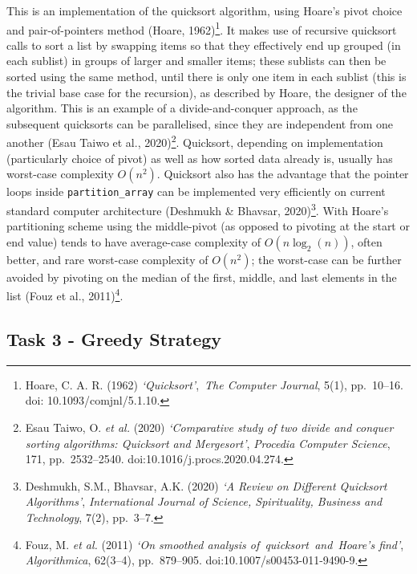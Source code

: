 \documentclass[
]{article}
\begin{document}
This is an implementation of the quicksort algorithm, using Hoare's
pivot choice and pair-of-pointers method (Hoare, 1962)\footnote{Hoare,
  C. A. R. (1962) \emph{`Quicksort'},~\emph{The Computer Journal}, 5(1),
  pp.~10--16. doi: 10.1093/comjnl/5.1.10.}. It makes use of recursive
quicksort calls to sort a list by swapping items so that they
effectively end up grouped (in each sublist) in groups of larger and
smaller items; these sublists can then be sorted using the same method,
until there is only one item in each sublist (this is the trivial base
case for the recursion), as described by Hoare, the designer of the
algorithm. This is an example of a divide-and-conquer approach, as the
subsequent quicksorts can be parallelised, since they are independent
from one another (Esau Taiwo et al., 2020)\footnote{Esau Taiwo, O.
  \emph{et al.} (2020) \emph{`Comparative study of two divide and
  conquer sorting algorithms: Quicksort and Mergesort'}, \emph{Procedia
  Computer Science}, 171, pp.~2532--2540.
  doi:10.1016/j.procs.2020.04.274.}. Quicksort, depending on
implementation (particularly choice of pivot) as well as how sorted data
already is, usually has worst-case complexity \(O(n^2)\). Quicksort also
has the advantage that the pointer loops inside
\texttt{partition\_array} can be implemented very efficiently on current
standard computer architecture (Deshmukh \& Bhavsar, 2020)\footnote{Deshmukh,
  S.M., Bhavsar, A.K. (2020) \emph{`A Review on Different Quicksort
  Algorithms'}, \emph{International Journal of Science, Spirituality,
  Business and Technology}, 7(2), pp.~3--7.}. With Hoare's partitioning
scheme using the middle-pivot (as opposed to pivoting at the start or
end value) tends to have average-case complexity of \(O(n \log_2(n))\),
often better, and rare worst-case complexity of \(O(n^2)\); the
worst-case can be further avoided by pivoting on the median of the
first, middle, and last elements in the list (Fouz et al.,
2011)\footnote{Fouz, M. \emph{et al.} (2011) \emph{`On smoothed analysis
  of~quicksort~and~Hoare's find'}, \emph{Algorithmica}, 62(3--4),
  pp.~879--905. doi:10.1007/s00453-011-9490-9.}.

\newpage

\subsection{Task 3 - Greedy Strategy}\label{task-3---greedy-strategy}
\end{document}
